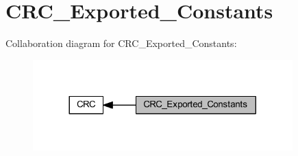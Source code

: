 \hypertarget{group___c_r_c___exported___constants}{}\section{C\+R\+C\+\_\+\+Exported\+\_\+\+Constants}
\label{group___c_r_c___exported___constants}
Collaboration diagram for C\+R\+C\+\_\+\+Exported\+\_\+\+Constants\+:
\nopagebreak
\begin{figure}[H]
\begin{center}
\leavevmode
\includegraphics[width=284pt]{group___c_r_c___exported___constants}
\end{center}
\end{figure}
